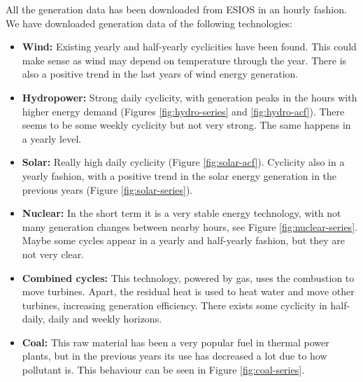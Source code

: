 All the generation data has been downloaded from ESIOS in an hourly fashion.
We have downloaded generation data of the following technologies:
\begin{itemize}
    \item \textbf{Wind:} Existing yearly and half-yearly cyclicities have been found. This could make sense as wind may depend on temperature through the year. There is also a positive trend in the last years of wind energy generation.
    \item \textbf{Hydropower:} Strong daily cyclicity, with generation peaks in the hours with higher energy demand (Figures \ref{fig:hydro-series} and \ref{fig:hydro-acf}). There seems to be some weekly cyclicity but not very strong. The same happens in a yearly level.
    \item \textbf{Solar:} Really high daily cyclicity (Figure \ref{fig:solar-acf}). Cyclicity also in a yearly fashion, with a positive trend in the solar energy generation in the previous years (Figure \ref{fig:solar-series}).
    \item \textbf{Nuclear:} In the short term it is a very stable energy technology, with not many generation changes between nearby hours, see Figure \ref{fig:nuclear-series}. Maybe some cycles appear in a yearly and half-yearly fashion, but they are not very clear.
    \item \textbf{Combined cycles:} This technology, powered by gas, uses the combustion to move turbines. Apart, the residual heat is used to heat water and move other turbines, increasing generation efficiency. There exists some cyclicity in half-daily, daily and weekly horizons.
    \item \textbf{Coal:} This raw material has been a very popular fuel in thermal power plants, but in the previous years its use has decreased a lot due to how pollutant is. This behaviour can be seen in Figure \ref{fig:coal-series}.
\end{itemize}

